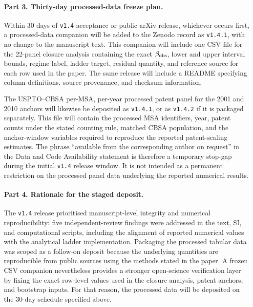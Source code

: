 \paragraph{Part 3. Thirty-day processed-data freeze plan.}
Within 30 days of \texttt{v1.4} acceptance or public arXiv release, whichever occurs first, a processed-data companion will be added to the Zenodo record as \texttt{v1.4.1}, with no change to the manuscript text. This companion will include one CSV file for the 22-panel closure analysis containing the exact \(\beta_{\rm obs}\), lower and upper interval bounds, regime label, ladder target, residual quantity, and reference source for each row used in the paper. The same release will include a README specifying column definitions, source provenance, and checksum information.

The USPTO--CBSA per-MSA, per-year processed patent panel for the 2001 and 2010 anchors will likewise be deposited as \texttt{v1.4.1}, or as \texttt{v1.4.2} if it is packaged separately. This file will contain the processed MSA identifiers, year, patent counts under the stated counting rule, matched CBSA population, and the anchor-window variables required to reproduce the reported patent-scaling estimates. The phrase ``available from the corresponding author on request'' in the Data and Code Availability statement is therefore a temporary stop-gap during the initial \texttt{v1.4} release window. It is not intended as a permanent restriction on the processed panel data underlying the reported numerical results.

\paragraph{Part 4. Rationale for the staged deposit.}
The \texttt{v1.4} release prioritised manuscript-level integrity and numerical reproducibility: five independent-review findings were addressed in the text, SI, and computational scripts, including the alignment of reported numerical values with the analytical ladder implementation. Packaging the processed tabular data was scoped as a follow-on deposit because the underlying quantities are reproducible from public sources using the methods stated in the paper. A frozen CSV companion nevertheless provides a stronger open-science verification layer by fixing the exact row-level values used in the closure analysis, patent anchors, and bootstrap inputs. For that reason, the processed data will be deposited on the 30-day schedule specified above.



